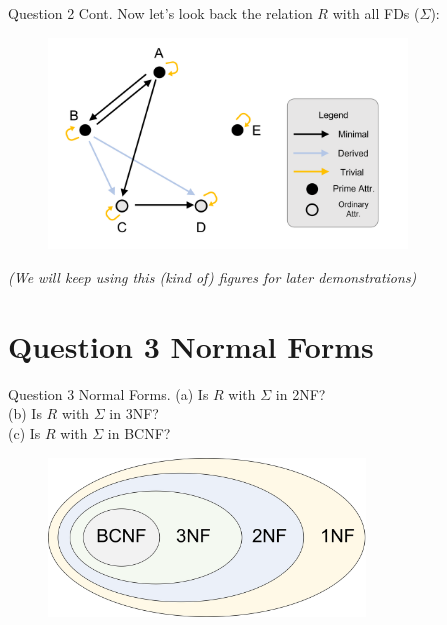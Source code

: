 \begin{frame}[fragile]{Question 2 Cont.}
Now let's look back the relation $R$ with all FDs ($\Sigma$):\\\vspace{5pt}
\begin{figure}
	\includegraphics[width=0.85\textwidth, trim=0 0 0 0, clip]{t5/images/end_q1.png}
\end{figure}

\textit{(We will keep using this (kind of) figures for later demonstrations)}
\end{frame}

\section*{Question 3 Normal Forms}

\begin{frame}[fragile]{Question 3 Normal Forms.}
(a) Is $R$ with $\Sigma$ in 2NF?\\
(b) Is $R$ with $\Sigma$ in 3NF?\\
(c) Is $R$ with $\Sigma$ in BCNF?\\\vspace{10pt}

\begin{figure}
	\includegraphics[width=0.75\textwidth, trim=0 0 0 0, clip]{t5/images/normal_forms.png}
\end{figure}
\end{frame}

